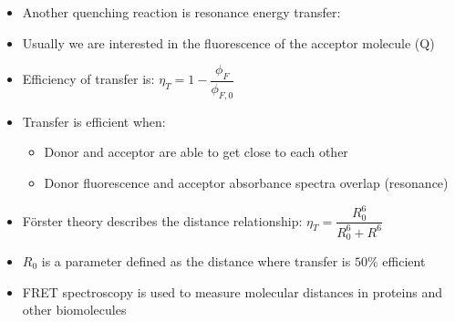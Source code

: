 \documentclass[12pt, openany, letterpaper]{memoir}
\begin{document}
\begin{itemize}
	\begin{itemize}
		\item Another quenching reaction is resonance energy transfer: 
		\item Usually we are interested in the fluorescence of the acceptor molecule (Q)
		\item Efficiency of transfer is: $\eta_T = 1 - \dfrac{\phi_F}{\phi_{F,0}}$
		\item Transfer is efficient when:
		\begin{itemize}
			\item Donor and acceptor are able to get close to each other
			\item Donor fluorescence and acceptor absorbance spectra overlap (resonance)
		\end{itemize}
		\item F\"orster theory describes the distance relationship: $\eta_T = \dfrac{R_0^6}{R_0^6 + R^6}$
		\item $R_0$ is a parameter defined as the distance where transfer is $50\%$ efficient
		\item FRET spectroscopy is used to measure molecular distances in proteins and other biomolecules
	\end{itemize}
\end{itemize}
\end{document}
